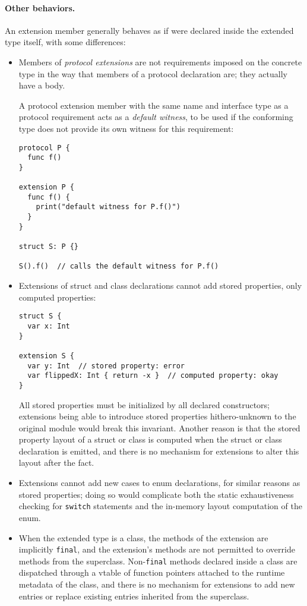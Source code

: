 \documentclass[../generics]{subfiles}
\begin{document}
\paragraph{Other behaviors.} An extension member generally behaves as if were declared inside the extended type itself, with some differences:
\begin{itemize}
\item Members of \emph{protocol extensions} are not requirements imposed on the concrete type in the way that members of a protocol declaration are; they actually have a body.

A protocol extension member with the same name and interface type as a protocol requirement acts as a \emph{default witness}, to be used if the conforming type does not provide its own witness for this requirement:
\begin{Verbatim}
protocol P {
  func f()
}

extension P {
  func f() {
    print("default witness for P.f()")
  }
}

struct S: P {}

S().f()  // calls the default witness for P.f()
\end{Verbatim}
\item Extensions of struct and class declarations cannot add stored properties, only computed properties:
\begin{Verbatim}
struct S {
  var x: Int
}

extension S {
  var y: Int  // stored property: error
  var flippedX: Int { return -x }  // computed property: okay
}
\end{Verbatim}
All stored properties must be initialized by all declared constructors; extensions being able to introduce stored properties hithero-unknown to the original module would break this invariant. Another reason is that the stored property layout of a struct or class is computed when the struct or class declaration is emitted, and there is no mechanism for extensions to alter this layout after the fact.
\item Extensions cannot add new cases to enum declarations, for similar reasons as stored properties; doing so would complicate both the static exhaustiveness checking for \texttt{switch} statements and the in-memory layout computation of the enum.

\item When the extended type is a class, the methods of the extension are implicitly \texttt{final}, and the extension's methods are not permitted to override methods from the superclass. Non-\texttt{final} methods declared inside a class are dispatched through a vtable of function pointers attached to the runtime metadata of the class, and there is no mechanism for extensions to add new entries or replace existing entries inherited from the superclass.


\end{itemize}
\end{document}
